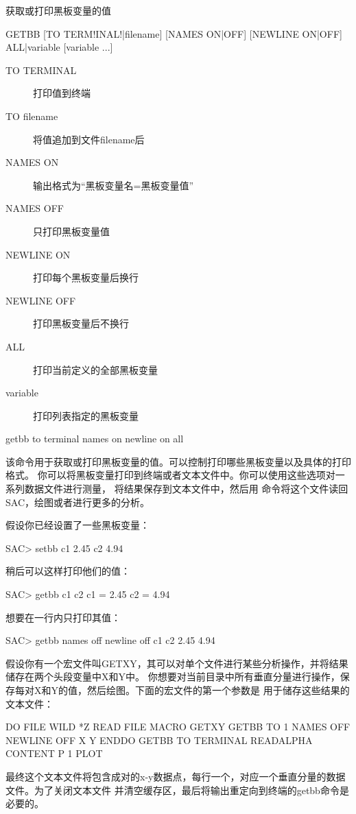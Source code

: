 \label{cmd:getbb}

获取或打印黑板变量的值

\begin{SACSTX}
GETBB [TO TERM!INAL!|filename] [NAMES ON|OFF] [NEWLINE ON|OFF]
    ALL|variable [variable ...]
\end{SACSTX}

\begin{description}
\item [TO TERMINAL] 打印值到终端
\item [TO filename] 将值追加到文件filename后
\item [NAMES ON] 输出格式为``黑板变量名=黑板变量值''
\item [NAMES OFF] 只打印黑板变量值
\item [NEWLINE ON] 打印每个黑板变量后换行
\item [NEWLINE OFF] 打印黑板变量后不换行
\item [ALL] 打印当前定义的全部黑板变量
\item [variable] 打印列表指定的黑板变量
\end{description}

\begin{SACDFT}
getbb to terminal names on newline on all
\end{SACDFT}

该命令用于获取或打印黑板变量的值。可以控制打印哪些黑板变量以及具体的打印格式。
你可以将黑板变量打印到终端或者文本文件中。你可以使用这些选项对一系列数据文件进行测量，
将结果保存到文本文件中，然后用  命令将这个文件读回SAC，绘图或者进行更多的分析。

假设你已经设置了一些黑板变量：
\begin{SACCode}
SAC> setbb c1 2.45 c2 4.94
\end{SACCode}

稍后可以这样打印他们的值：
\begin{SACCode}
SAC> getbb c1 c2
 c1 = 2.45
 c2 = 4.94
\end{SACCode}

想要在一行内只打印其值：
\begin{SACCode}
SAC> getbb names off newline off c1 c2
 2.45 4.94
\end{SACCode}

假设你有一个宏文件叫GETXY，其可以对单个文件进行某些分析操作，并将结果储存在两个头段变量中X和Y中。
你想要对当前目录中所有垂直分量进行操作，保存每对X和Y的值，然后绘图。下面的宏文件的第一个参数是
用于储存这些结果的文本文件：
\begin{SACCode}
DO FILE WILD *Z
  READ FILE
  MACRO GETXY
  GETBB TO 1 NAMES OFF NEWLINE OFF X Y
ENDDO
GETBB TO TERMINAL
READALPHA CONTENT P 1
PLOT
\end{SACCode}
最终这个文本文件将包含成对的x-y数据点，每行一个，对应一个垂直分量的数据文件。为了关闭文本文件
并清空缓存区，最后将输出重定向到终端的getbb命令是必要的。
